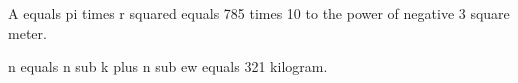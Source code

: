 A equals pi times r squared equals 785 times 10 to the power of negative 3 square meter.

n equals n sub k plus n sub ew equals 321 kilogram.
